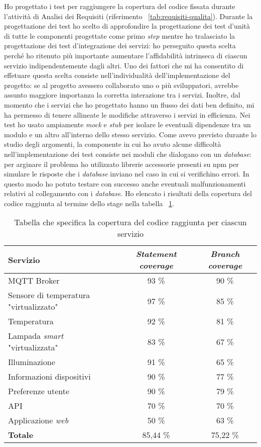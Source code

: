 Ho progettato i test per raggiungere la copertura del codice fissata durante l'attività di Analisi dei Requisiti (riferimento ~\ref{tab:requisiti-qualita}).
Durante la progettazione dei test ho scelto di approfondire la progettazione dei test d'unità di tutte le componenti progettate come primo \emph{step} mentre ho tralasciato la progettazione dei test d'integrazione dei servizi: ho perseguito questa scelta perché ho ritenuto più importante aumentare l'affidabilità intrinseca di ciascun servizio indipendentemente dagli altri.
Uno dei fattori che mi ha consentito di effetuare questa scelta consiste nell'individualità dell'implementazione del progetto: se al progetto avessero collaborato uno o più sviluppatori, avrebbe assunto maggiore importanza la corretta interazione tra i servizi. Inoltre, dal momento che i servizi che ho progettato hanno un flusso dei dati ben definito, mi ha permesso di tenere allineate le modifiche attraverso i servizi in efficienza.
Nei test ho usato ampiamente \emph{mock} e \emph{stub} per isolare le eventuali dipendenze tra un modulo e un altro all'interno dello stesso servizio. Come avevo previsto durante lo studio degli argomenti, la componente in cui ho avuto alcune difficoltà nell'implementazione dei test consiste nei moduli che dialogano con un \emph{database}: per arginare il problema ho utilizzato librerie accessorie presenti su npm per simulare le risposte che i \emph{database} inviano nel caso in cui si verifichino errori. In questo modo ho potuto testare con successo anche eventuali malfunzionamenti relativi al collegamento con i \emph{database}.
Ho elencato i risultati della copertura del codice raggiunta al termine dello stage nella tabella ~\ref{tab:coverage}.

\begin{table}[H]
\caption{Tabella che specifica la copertura del codice raggiunta per ciascun servizio}
\label{tab:coverage}
\begin{tabularx}{\linewidth}{|X|c|c|}
\hline
\textbf{Servizio} & \textbf{\emph{Statement coverage}} & \textbf{\emph{Branch coverage}} \\
\hline
MQTT Broker & 93 \% & 90 \% \\
\hline
Sensore di temperatura "virtualizzato" & 97 \% & 85 \% \\
\hline
Temperatura & 92 \% & 81 \% \\
\hline
Lampada \emph{smart} "virtualizzata" & 83 \% & 67 \% \\
\hline
Illuminazione & 91 \% & 65 \% \\
\hline
Informazioni dispositivi & 90 \% & 77 \% \\
\hline
Preferenze utente & 90 \% & 79 \% \\
\hline
API & 70 \% & 70 \% \\
\hline
Applicazione \emph{web} & 50 \% & 63 \% \\
\hline
\textbf{Totale} & 85,44 \% & 75,22 \% \\
\hline
\end{tabularx}
\end{table}

